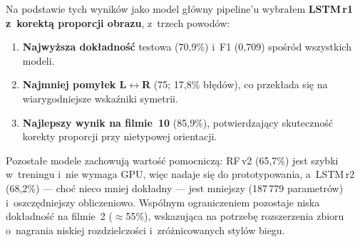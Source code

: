 Na podstawie tych wyników jako model główny pipeline'u wybrałem \textbf{LSTM\,r1 z~korektą proporcji obrazu}, z~trzech powodów:

\begin{enumerate}
    \item \textbf{Najwyższa dokładność} testowa (70{,}9\%) i~F1 (0{,}709) spośród wszystkich modeli.
    \item \textbf{Najmniej pomyłek L$\leftrightarrow$R} (75; 17{,}8\% błędów), co przekłada się na wiarygodniejsze wskaźniki symetrii.
    \item \textbf{Najlepszy wynik na filmie~10} (85{,}9\%), potwierdzający skuteczność korekty proporcji przy nietypowej orientacji.
\end{enumerate}

Pozostałe modele zachowują wartość pomocniczą: RF\,v2 (65{,}7\%) jest szybki w~treningu i~nie wymaga GPU, więc nadaje się do prototypowania, a~LSTM\,r2 (68{,}2\%) --- choć nieco mniej dokładny --- jest mniejszy (187\,779 parametrów) i~oszczędniejszy obliczeniowo. Wspólnym ograniczeniem pozostaje niska dokładność na filmie~2 ($\approx$55\%), wskazująca na potrzebę rozszerzenia zbioru o~nagrania niskiej rozdzielczości i~zróżnicowanych stylów biegu.
